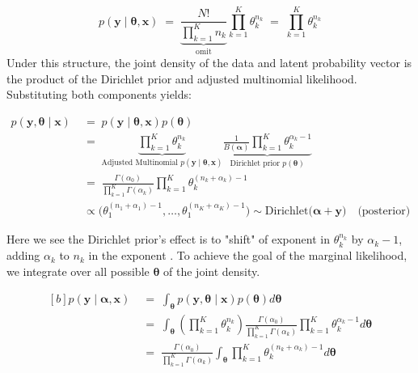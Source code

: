 \[
    p(\mathbf{y} \mid \boldsymbol{\theta}, \mathbf{x}) 
    \;=\;
   \underbrace{\frac{N!}{\prod_{k=1}^K n_k}}_{\text{omit}} \prod_{k=1}^K \theta_k^{n_k} 
    \;=\; 
    \prod_{k=1}^K \theta_k^{n_k} 
\]
Under this structure, the joint density of the data and latent probability vector is the product of the Dirichlet prior and adjusted multinomial likelihood. Substituting both components yields:

\begin{align*}
    p(\mathbf{y}, \boldsymbol{\theta} \mid \mathbf{x}) 
    \;&=\; 
    p(\mathbf{y} \mid \boldsymbol{\theta}, \mathbf{x}) p(\boldsymbol{\theta}) \\
    \;&=\;
    \underbrace{
    \prod_{k=1}^K \theta_k^{n_k}}_{\text{Adjusted Multinomial } p(\mathbf{y} \mid \boldsymbol{\theta}, \mathbf{x})} 
    \underbrace{
    \frac{1}{B(\boldsymbol{\alpha})} 
    \prod_{k=1}^K \theta_k^{\alpha_k -1}
    }_{\text{Dirichlet prior } p(\boldsymbol{\theta})}\\
    \;&=\;
    \frac{\Gamma(\alpha_0)}{\prod_{k=1}^K \Gamma(\alpha_k)} 
    \prod_{k=1}^K \theta_k^{(n_k + \alpha_k) - 1}\\
    &\varpropto \bigl( \theta_1^{(n_1+\alpha_1)-1},\ldots, \theta_1^{(n_K+\alpha_K)-1} \bigr) \sim \mathrm{Dirichlet} \bigl(\boldsymbol{\alpha}+\mathbf{y}\bigr) \quad \text{(posterior)}
\end{align*}

Here we see the Dirichlet prior's effect is to "shift" of exponent in \(\theta_k^{n_k}\) by \(\alpha_k-1\), adding \(\alpha_k\) to \(n_k\) in the exponent \parencite{mimno_polya}. To achieve the goal of the marginal likelihood, we integrate over all possible \(\boldsymbol{\theta}\) of the joint density.

\begin{equation}
    \label{eq:closed-form}
    \begin{aligned}[b]
        p(\mathbf{y} \mid \boldsymbol{\alpha}, \mathbf{x}) 
    \;&=\;
        \int_{\boldsymbol{\theta}} p(\mathbf{y}, \boldsymbol{\theta} \mid \mathbf{x})
        p(\boldsymbol{\theta})
        d\boldsymbol{\theta}\\
    \;&=\;
        \int_{\boldsymbol{\theta}} 
        \left( \prod_{k=1}^K \theta_k^{n_k}\right)
        \frac{\Gamma(\alpha_0)}{\prod_{k=1}^K \Gamma(\alpha_k)} \prod_{k=1}^K \theta_k^{\alpha_k-1} d\boldsymbol{\theta}\\
    \;&=\;
        \frac{\Gamma(\alpha_0)}{\prod_{k=1}^K \Gamma(\alpha_k)} 
        \int_{\boldsymbol{\theta}} \prod_{k=1}^K \theta_k^{(n_k + \alpha_k) -1} d\boldsymbol{\theta}\\
    \end{aligned}   
\end{equation}

